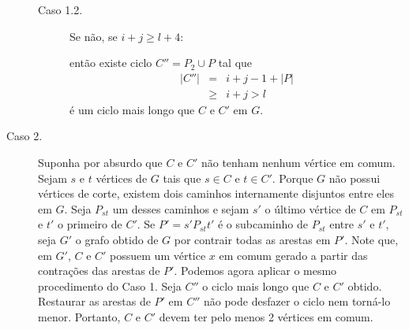 \begin{description}
\begin{description}
        \item[Caso 1.2.] Se não, se $i + j \ge l + 4$:

        então existe ciclo $C'' = P_2 \cup P$ tal que
        \begin{eqnarray}
            |C''| &=& i + j - 1 + |P| \nonumber \\
                 &\ge& i + j > l \nonumber
        \end{eqnarray}
        é um ciclo mais longo que $C$ e $C'$ em $G$.
    \end{description}

\item[Caso 2.] Suponha por absurdo que $C$ e $C'$ não tenham nenhum vértice em
comum. Sejam $s$ e $t$ vértices de $G$ tais que $s \in C$ e $t \in C'$. Porque
$G$ não possui vértices de corte, existem dois caminhos internamente disjuntos
entre eles em $G$. Seja $P_{st}$ um desses caminhos e sejam $s'$ o último
vértice de $C$ em $P_{st}$ e $t'$ o primeiro de $C'$. Se $P' = s'P_{st}t'$ é o
subcaminho de $P_{st}$ entre $s'$ e $t'$, seja $G'$ o grafo obtido de $G$ por
contrair todas as arestas em $P'$. Note que, em $G'$, $C$ e $C'$ possuem um
vértice $x$ em comum gerado a partir das contrações das arestas de $P'$.
Podemos agora aplicar o mesmo procedimento do Caso 1. Seja $C''$ o ciclo mais
longo que $C$ e $C'$ obtido. Restaurar as arestas de $P'$ em $C''$ não pode
desfazer o ciclo nem torná-lo menor. Portanto, $C$ e $C'$ devem ter pelo menos
2 vértices em comum.

\end{description}
